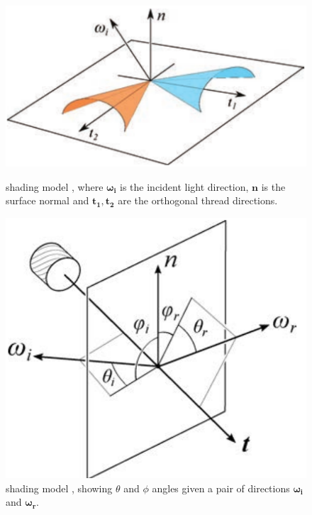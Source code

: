 \documentclass[12pt]{article}
\begin{document}
\begin{figure}[ht!]
\begin{minipage}[b]{.45\textwidth}
\centering
\includegraphics[width=1\textwidth]{images/microcylinders}
	\caption{\citeauthor{Sadeghi2013} shading model \cite{Sadeghi2013}, where $\boldsymbol{\omega_i}$ is the incident light direction, $\mathbf{n}$ is the surface normal and $\mathbf{t_1},\mathbf{t_2}$ are the orthogonal thread directions.}
	\label{fig:microcylinders}
\end{minipage}
\hfill
\begin{minipage}[b]{.45\textwidth}
\centering
\includegraphics[width=1\textwidth]{images/cloth_directions}
	\caption{\citeauthor{Sadeghi2013} shading model \cite{Sadeghi2013}, showing $\theta$ and $\phi$ angles given a pair of directions $\boldsymbol{\omega_i}$ and $\boldsymbol{\omega_r}$.}
	\label{fig:cloth_directions}
\end{minipage}
\end{figure}
\end{document}

